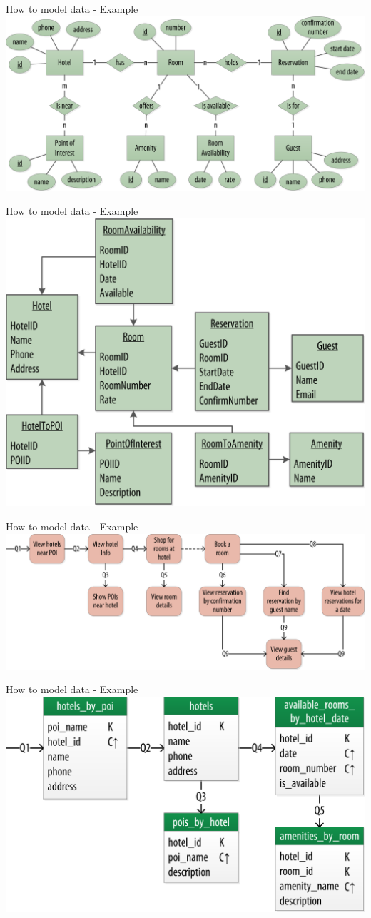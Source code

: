 \documentclass[
  10pt
]{beamer}
\begin{document}
\begin{frame}{How to model data - Example}
  \includegraphics[width=0.75\columnwidth]{resources/model_example_entity_relation_step0.png}
\end{frame}

\begin{frame}{How to model data - Example}
  \includegraphics[width=0.75\columnwidth]{resources/model_example_rdbms_step1.png}
\end{frame}

\begin{frame}{How to model data - Example}
  \includegraphics[width=0.75\columnwidth]{resources/model_example_queries_step2.png}
\end{frame}

\begin{frame}{How to model data - Example}
  \includegraphics[width=0.75\columnwidth]{resources/model_example_chebotko_step3.png}
\end{frame}
\end{document}
